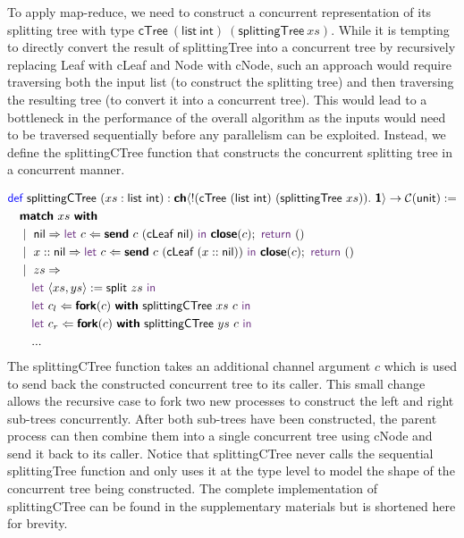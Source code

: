 To apply map-reduce, we need to construct a concurrent representation of its 
splitting tree with type $\textsf{cTree}\ (\textsf{list}\ \textsf{int})\ (\textsf{splittingTree}\ xs)$.
While it is tempting to directly convert the result of \textsf{splittingTree} into a concurrent tree
by recursively replacing \textsf{Leaf} with \textsf{cLeaf} and \textsf{Node} with \textsf{cNode},
such an approach would require traversing both the input list (to construct the splitting tree) 
and then traversing the resulting tree (to convert it into a concurrent tree). This would lead to a 
bottleneck in the performance of the overall algorithm as the inputs would need to be traversed 
sequentially before any parallelism can be exploited. Instead, we define the \textsf{splittingCTree} 
function that constructs the concurrent splitting tree in a concurrent manner.

\vspace{-1em}
\begingroup
\small
\addtolength{\jot}{-0.2em}
\begin{align*}
  &\Def\ \textsf{splittingCTree}\ (xs : \textsf{list}\ \textsf{int}) : 
      \CH{!(\textsf{cTree}\ (\textsf{list}\ \textsf{int})\ (\textsf{splittingTree}\ xs)).\ \End} \rightarrow \CM{\textsf{unit}} := \\
  &\quad\Match\ xs\ \With \\
  &\quad\mid\ \textsf{nil} \Rightarrow 
    \Let\ c \Leftarrow \Send\ c\ (\textsf{cLeaf}\ \textsf{nil})\ \In\ \Close(c);\ \Return\ () \\
  &\quad\mid\ x :: \textsf{nil} \Rightarrow 
    \Let\ c \Leftarrow \Send\ c\ (\textsf{cLeaf}\ (x :: \textsf{nil}))\ \In\ \Close(c);\ \Return\ () \\
  &\quad\mid\ zs \Rightarrow \\
  &\qquad\Let\ \langle{xs, ys}\rangle := \textsf{split}\ zs\ \In \\
  &\qquad\Let\ c_l \Leftarrow \Fork(c)\ \With\ \textsf{splittingCTree}\ xs\ c\ \In \\
  &\qquad\Let\ c_r \Leftarrow \Fork(c)\ \With\ \textsf{splittingCTree}\ ys\ c\ \In \\
  &\qquad ...
\end{align*}
\endgroup
The \textsf{splittingCTree} function takes an additional channel argument $c$ which is used to
send back the constructed concurrent tree to its caller. This small change allows the
recursive case to fork two new processes to construct the left and right sub-trees
concurrently. After both sub-trees have been constructed, the parent process can then
combine them into a single concurrent tree using \textsf{cNode} and send it back
to its caller. Notice that \textsf{splittingCTree} never calls the
sequential \textsf{splittingTree} function and only uses it at the type level to model
the shape of the concurrent tree being constructed. The complete implementation of
\textsf{splittingCTree} can be found in the supplementary materials but is shortened here for brevity.

